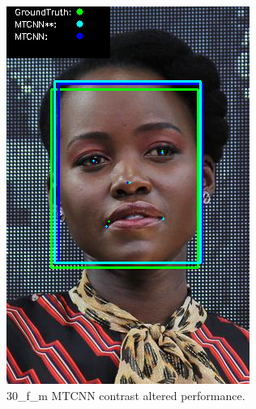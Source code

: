 \documentclass{l4proj}
\begin{document}
\begin{appendices}
\begin{figure}[h!]
\begin{minipage}{0.49\textwidth}
     \includegraphics[width=\textwidth]{images/mtcnn/30.png}
    \caption{30\_f\_m MTCNN contrast altered performance.}
    \label{whoopi_result}
  \end{minipage}
\end{figure}


\end{appendices}
\end{document}
